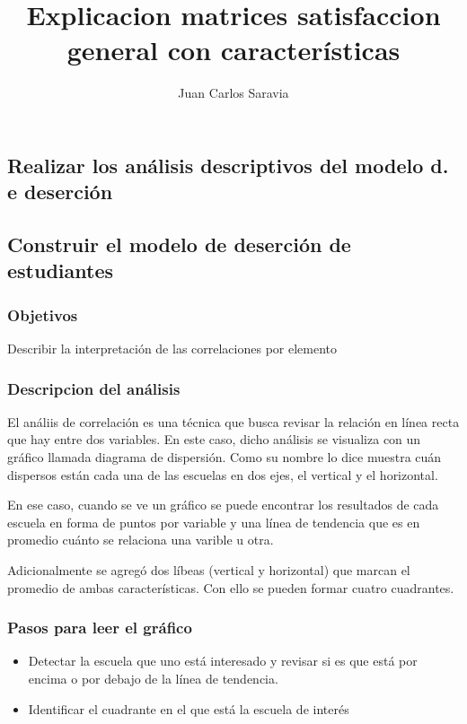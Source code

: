 \documentclass{beamer}
\title{Explicacion matrices satisfaccion general con características}
\author{Juan Carlos Saravia}
\date{}
\begin{document}
\begin{frame}
\titlepage
\end{frame}


\subsection{Realizar los análisis descriptivos del modelo d. e deserción}
\subsection{Construir el modelo de deserción de estudiantes}


\begin{frame}
\frametitle{Objetivos}
Describir la interpretación de las correlaciones por elemento
\end{frame}



\begin{frame}
\frametitle{Descripcion del análisis}
El análiis de correlación es una técnica que busca revisar la relación en línea recta que hay entre dos variables. En este caso, dicho análisis se visualiza con un gráfico llamada diagrama de dispersión. Como su nombre lo dice muestra cuán dispersos están cada una de las escuelas en dos ejes, el vertical y el horizontal. 

En ese caso, cuando se ve un gráfico se puede encontrar los resultados de cada escuela en forma de puntos por variable y una línea de tendencia que es en promedio cuánto se relaciona una varible u otra. 

Adicionalmente se agregó dos líbeas (vertical y horizontal) que marcan el promedio de ambas características. Con ello se pueden formar cuatro cuadrantes. 
\end{frame}

\begin{frame}
\frametitle{Pasos para leer el gráfico}

\begin{itemize}
\item Detectar la escuela que uno está interesado y revisar si es que está por encima o por debajo de la línea de tendencia. 
\item Identificar el cuadrante en el que está la escuela de interés 
\end{itemize}	

\end{frame}
\end{document}
